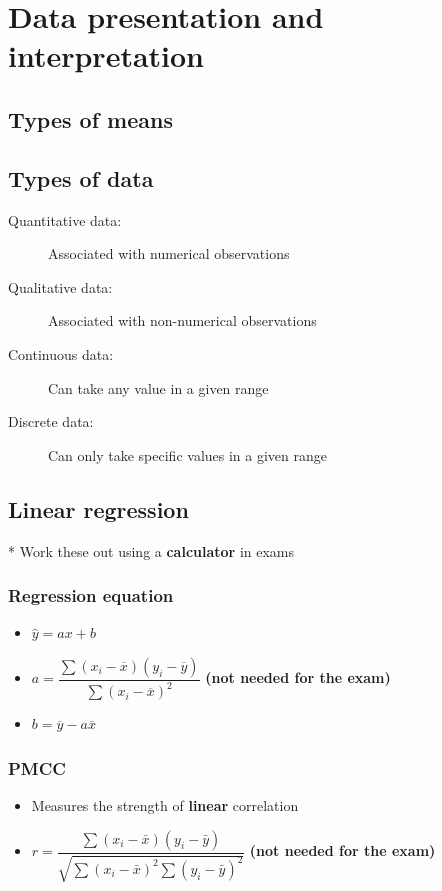 \documentclass[A4paper, 11pt]{article}
\begin{document}
	\pagebreak
	
	\section{Data presentation and interpretation}
	\subsection{Types of means}
	
	\subsection{Types of data}
	\begin{description}
		\item[Quantitative data:] Associated with numerical observations
		\item[Qualitative data:] Associated with non-numerical observations
		\item[Continuous data:] Can take any value in a given range
		\item[Discrete data:] Can only take specific values in a given range
	\end{description}
	
	\subsection{Linear regression}
	* Work these out using a \textbf{calculator} in exams
	\subsubsection{Regression equation}
	\begin{itemize}
		\item $\hat{y}=ax+b$
		\item $a=\dfrac{\sum (x_i-\overline{x}) (y_i-\overline{y})}{\sum (x_i-\overline{x})^2}$ \textbf{(not needed for the exam)}
		\item $b=\overline{y}-a\overline{x}$
	\end{itemize}
	
	\subsubsection{PMCC}
	\begin{itemize}
		\item Measures the strength of \textbf{linear} correlation
		\item $r =\dfrac{\sum\left(x_{i}-\bar{x}\right)\left(y_{i}-\bar{y}\right)}{\sqrt{\sum\left(x_{i}-\bar{x}\right)^{2} \sum\left(y_{i}-\bar{y}\right)^{2}}}$ \textbf{(not needed for the exam)}
	\end{itemize}
	
\end{document}
